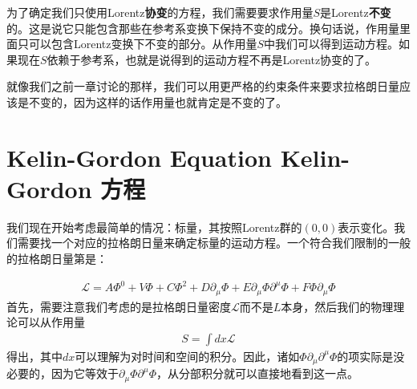 为了确定我们只使用Lorentz{\bf 协变}的方程，我们需要要求作用量$S$是Lorentz{\bf 不变}的。这是说它只能包含那些在参考系变换下保持不变的成分。换句话说，作用量里面只可以包含Lorentz变换下不变的部分。从作用量$S$中我们可以得到运动方程。如果现在$S$依赖于参考系，也就是说得到的运动方程不再是Lorentz协变的了。

就像我们之前一章讨论的那样，我们可以用更严格的约束条件来要求拉格朗日量应该是不变的，因为这样的话作用量也就肯定是不变的了。

\section[Kelin-Gordon 方程]{Kelin-Gordon Equation Kelin-Gordon 方程}\label{sec6.2}

我们现在开始考虑最简单的情况：标量，其按照Lorentz群的$(0,0)$表示变化。我们需要找一个对应的拉格朗日量来确定标量的运动方程。一个符合我们限制的一般的拉格朗日量第是：

\begin{align}
\mathscr{L} = A\Phi^0+V\Phi+C\Phi^2+D\partial_\mu\Phi+E\partial_\mu\Phi\partial^\mu\Phi+F\Phi\partial_\mu\Phi
\end{align}
首先，需要注意我们考虑的是拉格朗日量密度$\mathscr{L}$而不是$L$本身，然后我们的物理理论可以从作用量
\begin{align}
S = \int dx\mathscr{L}
\end{align}
得出，其中$dx$可以理解为对时间和空间的积分。因此，诸如$\Phi\partial_\mu\partial^\mu\Phi$的项实际是没必要的，因为它等效于$\partial_\mu\Phi\partial^\mu\Phi$，从分部积分就可以直接地看到这一点。

